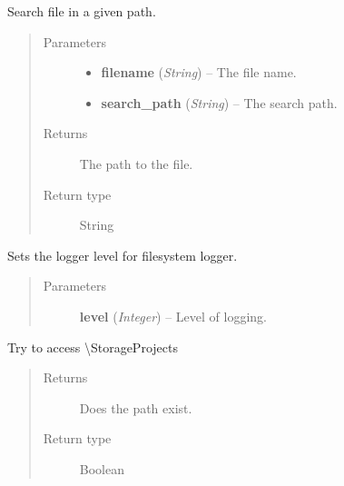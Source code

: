 \documentclass[letterpaper,10pt,english]{sphinxmanual}
\begin{document}

\begin{fulllineitems}
\label{filesystem:filesystem.search_file}
Search file in a given path.
\begin{quote}\begin{description}
\item[{Parameters}] \leavevmode\begin{itemize}
\item {} 
\textbf{filename} (\emph{String}) -- The file name.

\item {} 
\textbf{search\_path} (\emph{String}) -- The search path.

\end{itemize}

\item[{Returns}] \leavevmode
The path to the file.

\item[{Return type}] \leavevmode
String

\end{description}\end{quote}

\end{fulllineitems}


\begin{fulllineitems}
\label{filesystem:filesystem.set_logger_level}
Sets the logger level for filesystem logger.
\begin{quote}\begin{description}
\item[{Parameters}] \leavevmode
\textbf{level} (\emph{Integer}) -- Level of logging.

\end{description}\end{quote}

\end{fulllineitems}


\begin{fulllineitems}
\label{filesystem:filesystem.test_storage_connection}
Try to access \textbackslash{}StorageProjects
\begin{quote}\begin{description}
\item[{Returns}] \leavevmode
Does the path exist.

\item[{Return type}] \leavevmode
Boolean

\end{description}\end{quote}

\end{fulllineitems}
\end{document}
